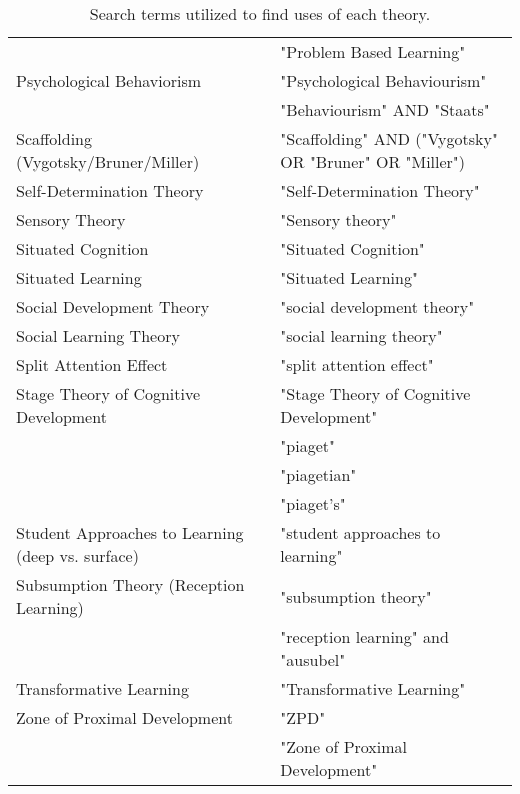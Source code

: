 \begin{table*}[t]
\begin{tabular}{ll}
 & "Problem Based Learning"\\
Psychological Behaviorism & "Psychological Behaviourism"\\
 & "Behaviourism" AND "Staats"\\
Scaffolding (Vygotsky/Bruner/Miller) & "Scaffolding" AND ("Vygotsky" OR "Bruner" OR "Miller")\\
Self-Determination Theory & "Self-Determination Theory"\\
Sensory Theory & "Sensory theory"\\
Situated Cognition & "Situated Cognition"\\
Situated Learning & "Situated Learning"\\
Social Development Theory & "social development theory"\\
Social Learning Theory & "social learning theory"\\
Split Attention Effect & "split attention effect"\\
Stage Theory of Cognitive Development & "Stage Theory of Cognitive Development"\\
 & "piaget"\\
 & "piagetian"\\
 & "piaget's"\\
Student Approaches to Learning (deep vs. surface) & "student approaches to learning"\\
Subsumption Theory (Reception Learning) & "subsumption theory"\\
 & "reception learning" and "ausubel"\\
Transformative Learning & "Transformative Learning"\\
Zone of Proximal Development & "ZPD"\\
 & "Zone of Proximal Development"
\end{tabular}
\caption{Search terms utilized to find uses of each theory.}
\end{table*}
